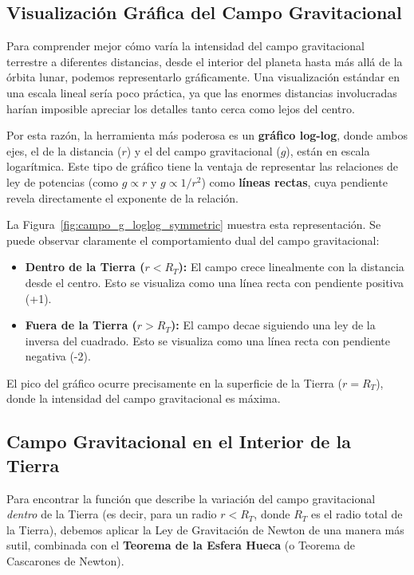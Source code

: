 \documentclass[11pt,a4paper]{book}
\begin{document}




\subsection{Visualización Gráfica del Campo Gravitacional}

Para comprender mejor cómo varía la intensidad del campo gravitacional terrestre a diferentes distancias, desde el interior del planeta hasta más allá de la órbita lunar, podemos representarlo gráficamente. Una visualización estándar en una escala lineal sería poco práctica, ya que las enormes distancias involucradas harían imposible apreciar los detalles tanto cerca como lejos del centro.

Por esta razón, la herramienta más poderosa es un \textbf{gráfico log-log}, donde ambos ejes, el de la distancia ($r$) y el del campo gravitacional ($g$), están en escala logarítmica. Este tipo de gráfico tiene la ventaja de representar las relaciones de ley de potencias (como $g \propto r$ y $g \propto 1/r^2$) como \textbf{líneas rectas}, cuya pendiente revela directamente el exponente de la relación.

La Figura~\ref{fig:campo_g_loglog_symmetric} muestra esta representación. Se puede observar claramente el comportamiento dual del campo gravitacional:
\begin{itemize}
    \item \textbf{Dentro de la Tierra ($r < R_T$):} El campo crece linealmente con la distancia desde el centro. Esto se visualiza como una línea recta con pendiente positiva (+1).
    \item \textbf{Fuera de la Tierra ($r > R_T$):} El campo decae siguiendo una ley de la inversa del cuadrado. Esto se visualiza como una línea recta con pendiente negativa (-2).
\end{itemize}
El pico del gráfico ocurre precisamente en la superficie de la Tierra ($r=R_T$), donde la intensidad del campo gravitacional es máxima.



\subsection*{Campo Gravitacional en el Interior de la Tierra}

Para encontrar la función que describe la variación del campo gravitacional \textit{dentro} de la Tierra (es decir, para un radio $r < R_T$, donde $R_T$ es el radio total de la Tierra), debemos aplicar la Ley de Gravitación de Newton de una manera más sutil, combinada con el \textbf{Teorema de la Esfera Hueca} (o Teorema de Cascarones de Newton).
\end{document}
